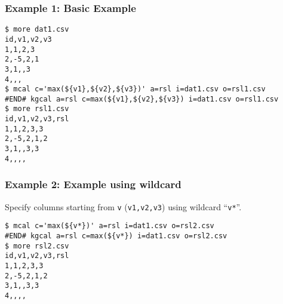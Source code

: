 \subsubsection*{Example 1: Basic Example}



\begin{Verbatim}[baselinestretch=0.7,frame=single]
$ more dat1.csv
id,v1,v2,v3
1,1,2,3
2,-5,2,1
3,1,,3
4,,,
$ mcal c='max(${v1},${v2},${v3})' a=rsl i=dat1.csv o=rsl1.csv
#END# kgcal a=rsl c=max(${v1},${v2},${v3}) i=dat1.csv o=rsl1.csv
$ more rsl1.csv
id,v1,v2,v3,rsl
1,1,2,3,3
2,-5,2,1,2
3,1,,3,3
4,,,,
\end{Verbatim}
\subsubsection*{Example 2: Example using wildcard}

Specify columns starting from \verb|v| (\verb|v1,v2,v3|) using wildcard “\verb|v*|”.


\begin{Verbatim}[baselinestretch=0.7,frame=single]
$ mcal c='max(${v*})' a=rsl i=dat1.csv o=rsl2.csv
#END# kgcal a=rsl c=max(${v*}) i=dat1.csv o=rsl2.csv
$ more rsl2.csv
id,v1,v2,v3,rsl
1,1,2,3,3
2,-5,2,1,2
3,1,,3,3
4,,,,
\end{Verbatim}
